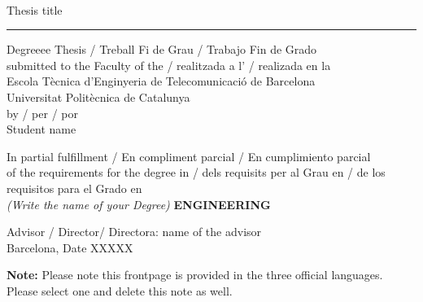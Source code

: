 \documentclass[a4paper,12pt]{article}
\begin{document}

\thispagestyle{empty}
\begin{center}
{\sffamily 
{}\\
\vspace{1cm}
{\Huge Thesis title}\\
\vspace{0.5cm}
{\color{black}\hrule height 1pt}
\vspace{1cm}
{\large{Degreeee Thesis / Treball Fi de Grau / Trabajo Fin de Grado\\
submitted to the Faculty of the / realitzada a l' / realizada en la \\
Escola T\`ecnica d'Enginyeria de Telecomunicaci\'o de Barcelona \\
Universitat Polit\`ecnica de Catalunya \\
by / per / por \\
\vspace{0.5cm}
Student name}}

\vspace{1.5cm}

{In partial fulfillment / En compliment parcial / En cumplimiento parcial\\
of the requirements for the degree in / dels requisits per al Grau en / de los requisitos para el Grado en \\
\textit{(Write the name of your Degree)} \textbf{ENGINEERING}}

\vspace{2cm}

{{Advisor / Director/ Directora: name of the advisor\\}}
{{Barcelona, Date XXXXX}}

\vspace{2cm}

{\color{red} \textbf{Note:} Please note this frontpage is provided in the three official languages. Please select one and delete this note as well.}
\thispagestyle{alim}
}

\end{center}
\end{document}
